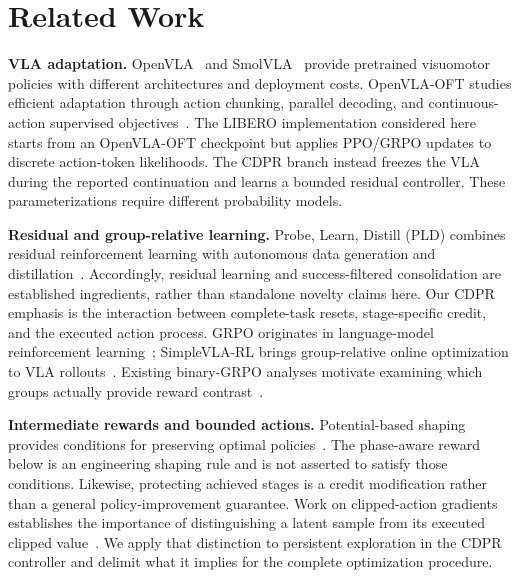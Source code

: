 \section{Related Work}\label{sec:related}
\textbf{VLA adaptation.} OpenVLA~\cite{openvla} and SmolVLA~\cite{smolvla} provide pretrained visuomotor policies with different architectures and deployment costs. OpenVLA-OFT studies efficient adaptation through action chunking, parallel decoding, and continuous-action supervised objectives~\cite{openvlaoft}. The LIBERO implementation considered here starts from an OpenVLA-OFT checkpoint but applies PPO/GRPO updates to discrete action-token likelihoods. The CDPR branch instead freezes the VLA during the reported continuation and learns a bounded residual controller. These parameterizations require different probability models.

\textbf{Residual and group-relative learning.} Probe, Learn, Distill (PLD) combines residual reinforcement learning with autonomous data generation and distillation~\cite{pld}. Accordingly, residual learning and success-filtered consolidation are established ingredients, rather than standalone novelty claims here. Our CDPR emphasis is the interaction between complete-task resets, stage-specific credit, and the executed action process. GRPO originates in language-model reinforcement learning~\cite{deepseekmath}; SimpleVLA-RL brings group-relative online optimization to VLA rollouts~\cite{simplevlarl}. Existing binary-GRPO analyses motivate examining which groups actually provide reward contrast~\cite{mroueh2026,bay2026}.

\textbf{Intermediate rewards and bounded actions.} Potential-based shaping provides conditions for preserving optimal policies~\cite{ng1999}. The phase-aware reward below is an engineering shaping rule and is not asserted to satisfy those conditions. Likewise, protecting achieved stages is a credit modification rather than a general policy-improvement guarantee. Work on clipped-action gradients establishes the importance of distinguishing a latent sample from its executed clipped value~\cite{capg}. We apply that distinction to persistent exploration in the CDPR controller and delimit what it implies for the complete optimization procedure.
